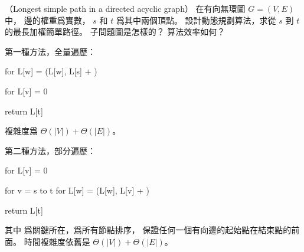\startPROBLEM
（Longest simple path in a directed acyclic graph）
在有向無環圖 $G=(V,E)$ 中，
邊的權重爲實數， $s$ 和 $t$ 爲其中兩個頂點。
設計動態規劃算法，求從 $s$ 到 $t$ 的最長加權簡單路徑。
子問題圖是怎樣的？
算法效率如何？
\stopPROBLEM

\startANSWER
第一種方法，全量遍歷：

\startCLRSCODE
for 
	L[w] = \max(L[w], L[s] + )
\stopCLRSCODE

\startCLRSCODE
for 
	L[v] = 0


return L[t]
\stopCLRSCODE

複雜度爲 $\Theta(|V|) + \Theta(|E|)$。

第二種方法，部分遍歷：

\startCLRSCODE
for 
	L[v] = 0

for  v = s to t 
	for 
		L[w] = \max(L[w], L[v] + )

return L[t]
\stopCLRSCODE

其中  爲關鍵所在，爲所有節點排序，
保證任何一個有向邊的起始點在結束點的前面。
時間複雜度依舊是 $\Theta(|V|) + \Theta(|E|)$。
\stopANSWER
